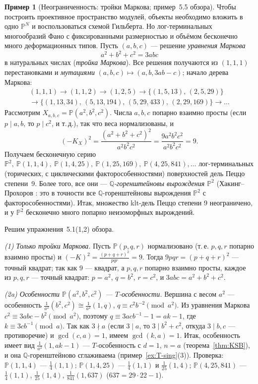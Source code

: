 \documentclass[11pt,a4paper]{article}
\theoremstyle{plain}
\theoremstyle{definition}
\newtheorem{example}[theorem]{Пример}
\theoremstyle{remark}
\newcommand{\Q}{\mathbb{Q}}
\newcommand{\PP}{\mathbb{P}}
\begin{document}
\begin{example}[Неограниченность: тройки Маркова; пример~5.5 обзора]\label{ex:Markov}
Чтобы построить проективное пространство модулей, объекты необходимо вложить в одно $\PP^N$ и
воспользоваться схемой Гильберта. Но лог-терминальных многообразий Фано с фиксированными
размерностью и объёмом бесконечно много деформационных типов. Пусть $(a,b,c)$ --- решение
\emph{уравнения Маркова}
\[
a^2+b^2+c^2=3abc
\]
в натуральных числах (\emph{тройка Маркова}). Все решения получаются из $(1,1,1)$ перестановками и
\emph{мутациями} $(a,b,c)\mapsto(a,b,3ab-c)$; начало дерева Маркова:
\begin{multline*}
(1,1,1)\to(1,1,2)\to(1,2,5)\to\{(1,5,13),\,(2,5,29)\}\\
\to\{(1,13,34),\,(5,13,194),\,(5,29,433),\,(2,29,169)\}\to\dots
\end{multline*}
Рассмотрим $X_{a,b,c}=\PP(a^2,b^2,c^2)$. Числа $a,b,c$ попарно взаимно просты (если $p\mid a,b$,
то $p\mid c^2$, и т.\,д.), так что веса нормализованы, и
\[
(-K_X)^2=\frac{(a^2+b^2+c^2)^2}{a^2b^2c^2}=\frac{9a^2b^2c^2}{a^2b^2c^2}=9 .
\]
Получаем бесконечную серию $\PP^2,\ \PP(1,1,4),\ \PP(1,4,25),\ \PP(1,25,169),\ \PP(4,25,841),\dots$
лог-терминальных (торических, с циклическими факторособенностями) поверхностей дель Пеццо степени~9.
Более того, все они --- \emph{$\Q$-горенштейновы вырождения $\PP^2$} (Хакинг--Прохоров \cite{HP}:
это в точности все $\Q$-горенштейновы вырождения $\PP^2$ с факторособенностями). Итак, множество
klt-дель Пеццо степени 9 неограничено, и у $\PP^2$ бесконечно много попарно неизоморфных вырождений.

Решим упражнения~5.1(1,2) обзора.

\emph{(1) Только тройки Маркова.} Пусть $\PP(p,q,r)$ нормализовано (т.\,е. $p,q,r$ попарно
взаимно просты) и $(-K)^2=\frac{(p+q+r)^2}{pqr}=9$. Тогда $9pqr=(p+q+r)^2$ --- точный квадрат; так
как $9$ --- квадрат, а $p,q,r$ попарно взаимно просты, каждое из $p,q,r$ --- точный квадрат:
$p=a^2$, $q=b^2$, $r=c^2$, и $3abc=a^2+b^2+c^2$.

\emph{(2a) Особенности $\PP(a^2,b^2,c^2)$ --- $T$-особенности.} Вершина с весом $a^2$ --- особенность
$\frac1{a^2}(b^2,c^2)\cong\frac1{a^2}(1,q)$, $q\equiv c^2b^{-2}\pmod{a^2}$. Из уравнения Маркова
$c^2\equiv3abc-b^2\pmod{a^2}$, поэтому $q\equiv3acb^{-1}-1=ak-1$, где $k\equiv3cb^{-1}\pmod a$.
Так как $3\nmid a$ (если $3\mid a$, то $3\mid b^2+c^2$, откуда $3\mid b,c$ --- противоречие) и
$\gcd(c,a)=1$, имеем $\gcd(k,a)=1$. Итак, особенность имеет вид $\frac1{a^2}(1,ak-1)$ ---
$T$-особенность с $d=1$, $n=a$ (теорема~\ref{thm:KSB}), и она $\Q$-горенштейново сглаживаема
(пример~\ref{ex:T-sing}(3)). Проверка: $\PP(1,1,4)$ --- $\frac14(1,1)$; $\PP(1,4,25)$ ---
$\frac14(1,1)$ и $\frac1{25}(1,4)$; $\PP(4,25,841)$ --- $\frac14(1,1)$, $\frac1{25}(1,4)$,
$\frac1{841}(1,637)$ ($637=29\cdot22-1$).


\end{example}
\end{document}
